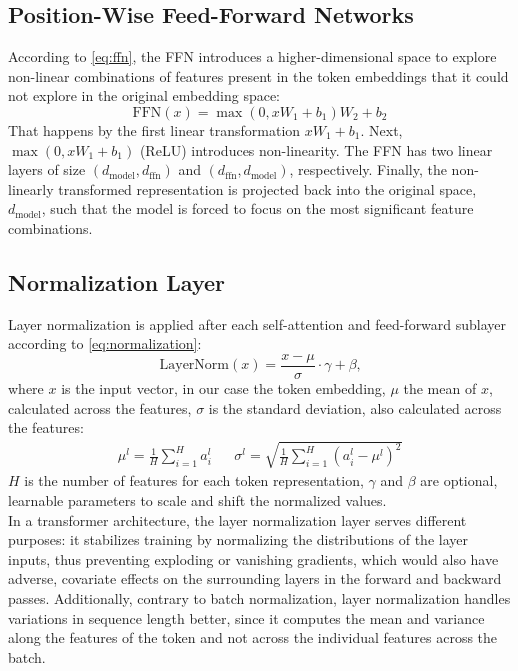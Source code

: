 \subsection{Position-Wise Feed-Forward Networks} \label{sec:ffn}
According to \cref{eq:ffn}, the FFN introduces a higher-dimensional space to explore non-linear combinations of features present in the token embeddings that it could not explore in the original embedding space:
\begin{equation}\label{eq:ffn}
	\text{FFN}(x) = \max(0, xW_1 + b_1)W_2 + b_2
\end{equation}
That happens by the first linear transformation \(xW_1 + b_1\).
Next, \(\max(0, xW_1 + b_1)\) (ReLU) introduces non-linearity.
The FFN has two linear layers of size \(\left(d_{\text{model}}, d_{\text{ffn}}\right)\) and \(\left(d_{\text{ffn}}, d_{\text{model}}\right)\), respectively.
Finally, the non-linearly transformed representation is projected back into the original space, \(d_{\text{model}}\), such that the model is forced to focus on the most significant feature combinations.

\subsection{Normalization Layer} \label{sec:normalization}
Layer normalization is applied after each self-attention and feed-forward sublayer according to \cref{eq:normalization}:
\begin{equation}\label{eq:normalization}
    \text{LayerNorm}(x) = \frac{x - \mu}{\sigma} \cdot \gamma + \beta \text{,}
\end{equation}
where \(x\) is the input vector, in our case the token embedding, \(\mu\) the mean of \(x\), calculated across the features, \(\sigma\) is the standard deviation, also calculated across the features:
\begin{align}
	\mu^l = \frac{1}{H} \sum_{i=1}^H a_i^l &   & \sigma^l = \sqrt{\frac{1}{H}\sum_{i=1}^H (a_i^l - \mu^l)^2} 
\end{align}
\(H\) is the number of features for each token representation, \(\gamma\) and \(\beta\) are optional, learnable parameters to scale and shift the normalized values. \\
In a transformer architecture, the layer normalization layer serves different purposes: it stabilizes training by normalizing the distributions of the layer inputs, thus preventing exploding or vanishing gradients, which would also have adverse, covariate effects on the surrounding layers in the forward and backward passes.
Additionally, contrary to batch normalization, layer normalization handles variations in sequence length better, since it computes the mean and variance along the features of the token and not across the individual features across the batch.

